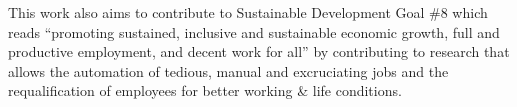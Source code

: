 \documentclass[12pt,twoside]{article}
\begin{document}
This work also aims to contribute to Sustainable Development Goal \#8\footnotemark[\value{footnote}]{} which reads ``promoting sustained, inclusive and sustainable economic growth, full and productive employment, and decent work for all'' by contributing to research that allows the automation of tedious, manual and excruciating jobs and the requalification of employees for better working \& life conditions.


\clearpage


\end{document}
